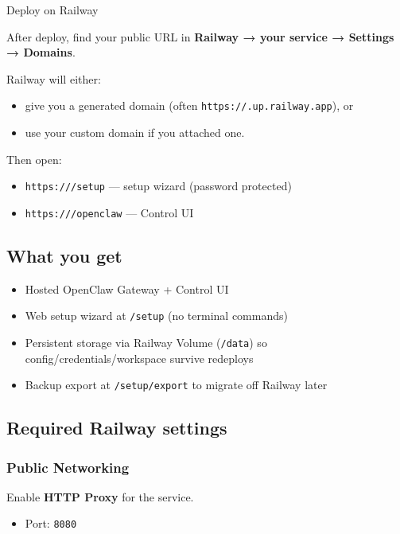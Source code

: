 Deploy on Railway

After deploy, find your public URL in \textbf{Railway → your service → Settings → Domains}.

Railway will either:

\begin{itemize}
  \item give you a generated domain (often \texttt{https://.up.railway.app}), or
  \item use your custom domain if you attached one.
\end{itemize}


Then open:

\begin{itemize}
  \item \texttt{https:///setup} — setup wizard (password protected)
  \item \texttt{https:///openclaw} — Control UI
\end{itemize}


\subsection{What you get}


\begin{itemize}
  \item Hosted OpenClaw Gateway + Control UI
  \item Web setup wizard at \texttt{/setup} (no terminal commands)
  \item Persistent storage via Railway Volume (\texttt{/data}) so config/credentials/workspace survive redeploys
  \item Backup export at \texttt{/setup/export} to migrate off Railway later
\end{itemize}


\subsection{Required Railway settings}


\subsubsection{Public Networking}


Enable \textbf{HTTP Proxy} for the service.

\begin{itemize}
  \item Port: \texttt{8080}
\end{itemize}


